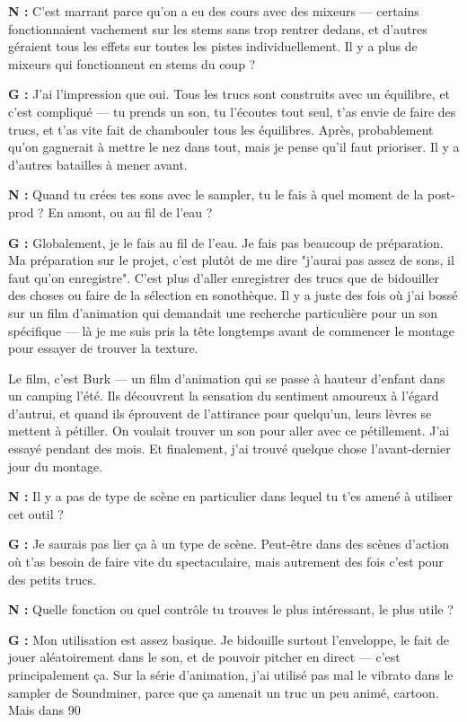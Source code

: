 ﻿\documentclass[12pt]{article}
\begin{document}
\textbf{N :} C'est marrant parce qu'on a eu des cours avec des mixeurs — certains fonctionnaient vachement sur les stems sans trop rentrer dedans, et d'autres géraient tous les effets sur toutes les pistes individuellement. Il y a plus de mixeurs qui fonctionnent en stems du coup ? 

\textbf{G :} J'ai l'impression que oui. Tous les trucs sont construits avec un équilibre, et c'est compliqué — tu prends un son, tu l'écoutes tout seul, t'as envie de faire des trucs, et t'as vite fait de chambouler tous les équilibres. Après, probablement qu'on gagnerait à mettre le nez dans tout, mais je pense qu'il faut prioriser. Il y a d'autres batailles à mener avant. 

\textbf{N :} Quand tu crées tes sons avec le sampler, tu le fais à quel moment de la post-prod ? En amont, ou au fil de l'eau ? 

\textbf{G :} Globalement, je le fais au fil de l'eau. Je fais pas beaucoup de préparation. Ma préparation sur le projet, c'est plutôt de me dire "j'aurai pas assez de sons, il faut qu'on enregistre". C'est plus d'aller enregistrer des trucs que de bidouiller des choses ou faire de la sélection en sonothèque. Il y a juste des fois où j'ai bossé sur un film d'animation qui demandait une recherche particulière pour un son spécifique — là je me suis pris la tête longtemps avant de commencer le montage pour essayer de trouver la texture. 

Le film, c'est Burk — un film d'animation qui se passe à hauteur d'enfant dans un camping l'été. Ils découvrent la sensation du sentiment amoureux à l'égard d'autrui, et quand ils éprouvent de l'attirance pour quelqu'un, leurs lèvres se mettent à pétiller. On voulait trouver un son pour aller avec ce pétillement. J'ai essayé pendant des mois. Et finalement, j'ai trouvé quelque chose l'avant-dernier jour du montage. 

\textbf{N :} Il y a pas de type de scène en particulier dans lequel tu t'es amené à utiliser cet outil ? 

\textbf{G :} Je saurais pas lier ça à un type de scène. Peut-être dans des scènes d'action où t'as besoin de faire vite du spectaculaire, mais autrement des fois c'est pour des petits trucs. 

\textbf{N :} Quelle fonction ou quel contrôle tu trouves le plus intéressant, le plus utile ? 

\textbf{G :} Mon utilisation est assez basique. Je bidouille surtout l'enveloppe, le fait de jouer aléatoirement dans le son, et de pouvoir pitcher en direct — c'est principalement ça. Sur la série d'animation, j'ai utilisé pas mal le vibrato dans le sampler de Soundminer, parce que ça amenait un truc un peu animé, cartoon. Mais dans 90 %
\end{document}

